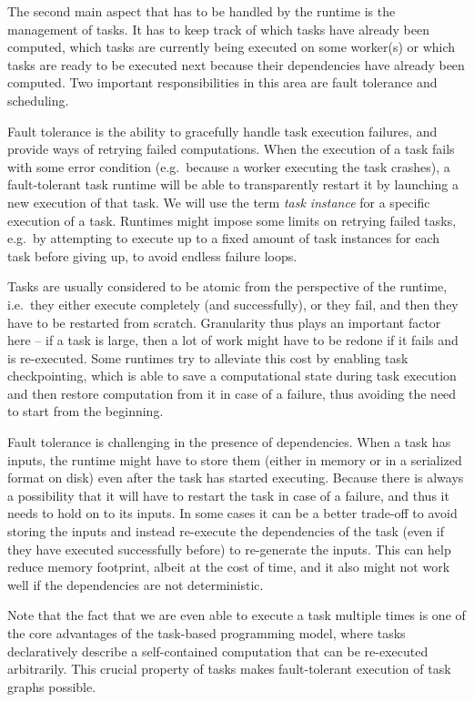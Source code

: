 The second main aspect that has to be handled by the runtime is the management of tasks. It has to
keep track of which tasks have already been computed, which tasks are currently being executed on
some worker(s) or which tasks are ready to be executed next because their dependencies have already
been computed. Two important responsibilities in this area are fault tolerance and scheduling.

Fault tolerance is the ability to gracefully handle task execution failures, and provide ways of
retrying failed computations. When the execution of a task fails with some error condition (e.g.\
because a worker executing the task crashes), a fault-tolerant task runtime will be able to
transparently restart it by launching a new execution of that task. We will use the term
\emph{task instance} for a specific execution of a task. Runtimes might impose some limits on
retrying failed tasks, e.g.\ by attempting to execute up to a fixed amount of task instances for
each task before giving up, to avoid endless failure loops.

Tasks are usually considered to be atomic from the perspective of the runtime, i.e.\ they either
execute completely (and successfully), or they fail, and then they have to be restarted from
scratch. Granularity thus plays an important factor here -- if a task is large, then a lot of work
might have to be redone if it fails and is re-executed. Some runtimes try to alleviate this cost by
enabling task checkpointing, which is able to save a computational state during task execution and
then restore computation from it in case of a failure, thus avoiding the need to start from the
beginning.

Fault tolerance is challenging in the presence of dependencies. When a task has inputs, the runtime
might have to store them (either in memory or in a serialized format on disk) even after the task
has started executing. Because there is always a possibility that it will have to restart the task
in case of a failure, and thus it needs to hold on to its inputs. In some cases it can be a better
trade-off to avoid storing the inputs and instead re-execute the dependencies of the task (even if
they have executed successfully before) to re-generate the inputs. This can help reduce memory
footprint, albeit at the cost of time, and it also might not work well if the dependencies are not
deterministic.

Note that the fact that we are even able to execute a task multiple times is one of the core
advantages of the task-based programming model, where tasks declaratively describe a self-contained
computation that can be re-executed arbitrarily. This crucial property of tasks makes
fault-tolerant execution of task graphs possible.


